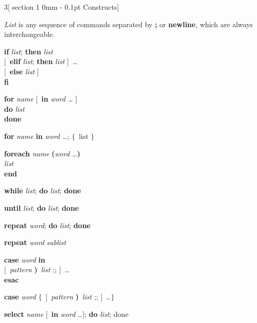 \documentclass{article}
\makeatletter
\renewcommand{\section}{\@startsection
  {section}%
  {1}%
  {0mm}%
  {-\baselineskip}%
  {0.1pt}%
  {\normalfont\normalsize\scshape}} %
\newcommand{\codelabel}[1]{\mbox{\textsl{#1}}\hfil}
\newenvironment{code}%
{\begin{list}{}{\renewcommand{\makelabel}{\codelabel}%
    \setlength{\rightmargin}{0pt}%
    \setlength{\leftmargin}{1em}}}%
{\end{list}}
\newcommand\B[1]{\textbf{#1}}
\newcommand\I[1]{\textsl{#1}}
\newcommand\Lop{\ensuremath{[}}
\newcommand\Rop{\ensuremath{]}}
\newcommand\Lcu{\ensuremath{\mathbf{\{}}}
\newcommand\Rcu{\ensuremath{\mathbf{\}}}}
\newcommand\Lpa{\textbf{(}}
\newcommand\Rpa{\textbf{)}}
\makeatother
\begin{document}

\pagestyle{fancy}

\raggedcolumns
\setlength{\premulticols}{100pt}
\begin{multicols}{3}[\section{Constructs}]

\I{List} is any sequence of commands separated by \B{;} or
\B{newline}, which are always interchangeable.
\medskip

\begin{code}
\item \B{if} \I{list}; \B{then} \I{list} \\
\Lop\ \B{elif} \I{list}; \B{then} \I{list} \Rop\ \dots \\
\Lop\ \B{else} \I{list} \Rop \\
\B{fi}

\item \B{for} \I{name} \Lop\ \B{in} \I{word \dots} \Rop \\
\B{do} \I{list} \\
\B{done}

\B{for} \I{name} \B{in} \I{word \dots}; \Lcu\ list \Rcu

\B{foreach} \I{name} \Lpa \I{word \dots}\Rpa \\
\I{list} \\
\B{end} \\

\item \B{while} \I{list}; \B{do} \I{list}; \B{done}

\B{until} \I{list}; \B{do} \I{list}; \B{done}

\item \B{repeat} \I{word}; \B{do} \I{list}; \B{done}

\B{repeat} \I{word} \I{sublist}

\item \B{case} \I{word} \B{in} \\
\Lop\ \I{pattern} \Rpa\ \I{list} ;; \Rop\ \dots \\
\B{esac}

\B{case} \I{word} \Lcu\ \Lop\ \I{pattern} \Rpa\ \I{list} ;; \Rop\ \dots \Rcu

\item \B{select} \I{name}
  \Lop\ \B{in} \I{word} \dots \Rop; \B{do} \I{list};
  done


\end{code}
\end{multicols}
\end{document}
